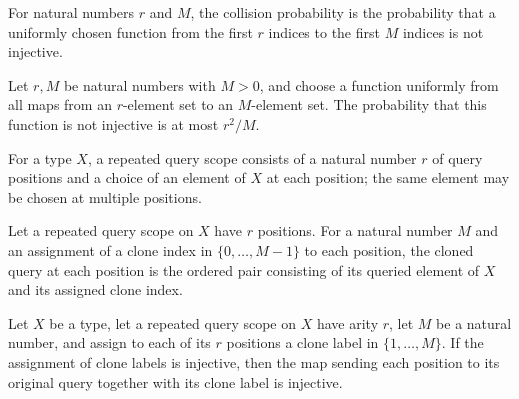 \begin{definition}
\label{FABL.cloneTupleCollisionProbability}
\leanok
For natural numbers $r$ and $M$, the collision probability is the probability that a
uniformly chosen function from the first $r$ indices to the first $M$ indices is not
injective.
\end{definition}

\begin{theorem}
\label{FABL.cloneTupleCollisionProbability_le}
\leanok
{}
Let $r,M$ be natural numbers with $M>0$, and choose a function uniformly from all maps
from an $r$-element set to an $M$-element set. The probability that this function is not
injective is at most $r^2/M$.
\end{theorem}

\begin{definition}
\label{FABL.RepeatedQueryScope}
\leanok
For a type $X$, a repeated query scope consists of a natural number $r$ of query
positions and a choice of an element of $X$ at each position; the same element may be
chosen at multiple positions.
\end{definition}

\begin{definition}
\label{FABL.RepeatedQueryScope.clonedQuery}
\leanok
Let a repeated query scope on $X$ have $r$ positions. For a natural number $M$ and an
assignment of a clone index in $\{0,\ldots,M-1\}$ to each position, the cloned query
at each position is the ordered pair consisting of its queried element of $X$ and its
assigned clone index.
\end{definition}

\begin{theorem}
\label{FABL.RepeatedQueryScope.clonedQuery_injective_of_cloneTuple_injective}
\leanok
{}
Let $X$ be a type, let a repeated query scope on $X$ have arity $r$, let $M$ be a
natural number, and assign to each of its $r$ positions a clone label in
$\{1,\ldots,M\}$. If the assignment of clone labels is injective, then the map sending
each position to its original query together with its clone label is injective.
\end{theorem}


